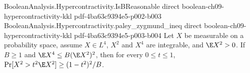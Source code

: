 \begin{lemma}
\leanok
{}
\label{BooleanAnalysis.Hypercontractivity.b_reasonable_anticon_zero}
\proofstep
  {BooleanAnalysis.Hypercontractivity.IsBReasonable}
  {direct}
  {boolean-ch09-hypercontractivity-kkl}
  {pdf-4ba63c9394e5-p002-b003}
\proofstep
  {BooleanAnalysis.Hypercontractivity.paley_zygmund_ineq}
  {direct}
  {boolean-ch09-hypercontractivity-kkl}
  {pdf-4ba63c9394e5-p003-b004}
Let $X$ be measurable on a probability space, assume $X\in L^4$, $X^2$ and $X^4$ are
integrable, and $\E X^2>0$. If $B\ge1$ and $\E X^4\le B(\E X^2)^2$, then for every $0\le
t\le1$, $\Pr[X^2>t^2\E X^2]\ge(1-t^2)^2/B$.
\end{lemma}
